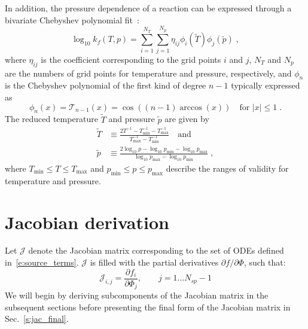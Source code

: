 \documentclass[12pt]{article}
\newcommand{\ns}{\ensuremath{{N_{sp}}}}
\begin{document}
In addition, the pressure dependence of a reaction can be expressed through a bivariate Chebyshev polynomial fit~\cite{Venkatesh:1997hv,Venkatesh:1997ik,Venkatesh:2000gj,chemkin:2012,Goodwin:2015aa}:
\begin{equation}
\log_{10} k_f (T, p) = \sum_{i = 1}^{N_T} \sum_{j = 1}^{N_p} \eta_{ij} \phi_i (\tilde{T}) \phi_j \left(\tilde{p}\right) \label{e:cheb} \;,
\end{equation}
where $\eta_{ij}$ is the coefficient corresponding to the grid points $i$ and $j$, $N_T$ and $N_p$ are the numbers of grid points for temperature and pressure, respectively, and $\phi_n$ is the Chebyshev polynomial of the first kind of degree $n - 1$ typically expressed as
\begin{equation}
\phi_n (x) = \mathcal{T}_{n-1} (x) = \cos \left( (n - 1) \arccos (x) \right) \quad \text{for } |x| \leq 1 \;.
\end{equation}
The reduced temperature $\tilde{T}$ and pressure $\tilde{p}$ are given by
\begin{align}
\tilde{T} &\equiv \frac{2 T^{-1} - T^{-1}_{\min} - T^{-1}_{\max}}{T^{-1}_{\max} - T^{-1}_{\min}} \quad\text{and} \\
\tilde{p} &\equiv \frac{2\log_{10} p - \log_{10} p_{\min} - \log_{10} p_{\max}}{\log_{10} p_{\max} - \log_{10} p_{\min}} \;,
\end{align}
where $T_{\min} \leq T \leq T_{\max}$ and $p_{\min} \leq p \leq p_{\max}$ describe the ranges of validity for temperature and pressure.

\section{Jacobian derivation}

Let $\mathcal{J}$ denote the Jacobian matrix corresponding to the set of ODEs defined in~\eqref{e:source_terms}.
$\mathcal{J}$ is filled with the partial derivatives $\partial f / \partial \Phi$, such that:
\begin{equation}
 \mathcal{J}_{i,j} = \frac{\partial f_i}{\partial \Phi_j},\qquad j=1 \ldots \ns - 1
\end{equation}
We will begin by deriving subcomponents of the Jacobian matrix in the subsequent sections before presenting the final form of the Jacobian matrix in Sec.~\ref{s:jac_final}.
\end{document}
